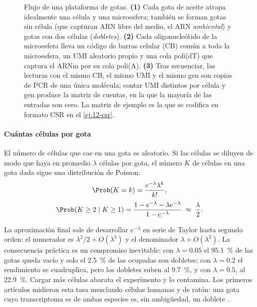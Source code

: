 \begin{figure}[t]
\caption[De la gota a la matriz de cuentas]{Flujo de una plataforma de gotas. \textbf{(1)} Cada gota de aceite atrapa idealmente una célula y una microesfera; también se forman gotas sin célula (que capturan ARN libre del medio, el ARN \emph{ambiental}) y gotas con dos células (\emph{dobletes}). \textbf{(2)} Cada oligonucleótido de la microesfera lleva un código de barras celular (CB) común a toda la microesfera, un UMI aleatorio propio y una cola poli(dT) que captura el ARNm por su cola poli(A). \textbf{(3)} Tras secuenciar, las lecturas con el mismo CB, el mismo UMI y el mismo gen son copias de PCR de una única molécula; contar UMI distintos por célula y gen produce la matriz de cuentas, en la que la mayoría de las entradas son cero. La matriz de ejemplo es la que se codifica en formato CSR en el \cref{ej:12-csr}.}
\label{fig:12-gotas}
\end{figure}

\paragraph{Cuántas células por gota} El número de células que cae en una gota es aleatorio. Si las células se diluyen de modo que haya en promedio $\lambda$ células por gota, el número $K$ de células en una gota dada sigue una distribución de Poisson:
\begin{equation}\label{eq:12-poisson}
\begin{gathered}
\Prob(K=k) = \frac{e^{-\lambda}\lambda^k}{k!},\\[2pt]
\Prob(K\ge 2 \mid K\ge 1) = \frac{1-e^{-\lambda}-\lambda e^{-\lambda}}{1-e^{-\lambda}} \;\approx\; \frac{\lambda}{2}.
\end{gathered}
\end{equation}
\begin{simbolos}
\end{simbolos}
La aproximación final sale de desarrollar $e^{-\lambda}$ en serie de Taylor hasta segundo orden: el numerador es $\lambda^2/2+O(\lambda^3)$ y el denominador $\lambda+O(\lambda^2)$. La consecuencia práctica es un compromiso inevitable: con $\lambda=\num{0.05}$ el \SI{95.1}{\percent} de las gotas queda vacío y solo el \SI{2.5}{\percent} de las ocupadas son dobletes; con $\lambda=\num{0.2}$ el rendimiento se cuadruplica, pero los dobletes suben al \SI{9.7}{\percent}, y con $\lambda=\num{0.5}$, al \SI{22.9}{\percent}. Cargar más células abarata el experimento y lo contamina. Los primeros artículos midieron esta tasa mezclando células humanas y de ratón: una gota cuyo transcriptoma es de ambas especies es, sin ambigüedad, un doblete \parencite{c12-macosko2015}.

